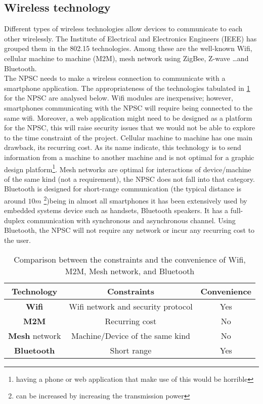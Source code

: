 \subsection{Wireless technology}\label{wireless_technologies}
Different types of wireless technologies allow devices to communicate to each other wirelessly. The Institute of Electrical and Electronics Engineers (IEEE) has grouped them in the 802.15 technologies. Among these are the well-known Wifi, cellular machine to machine (M2M), mesh network using ZigBee, Z-wave \ldots and Bluetooth. \\
The NPSC needs to make a wireless connection to communicate with a smartphone application. The appropriateness of the technologies tabulated in \cref{table:wireless} for the NPSC are analysed below. 
Wifi modules are inexpensive; however, smartphones communicating with the NPSC will require being connected to the same wifi. Moreover, a web application might need to be designed as a platform for the NPSC, this will raise security issues that we would not be able to explore to the time constraint of the project. Cellular machine to machine has one main drawback, its recurring cost. As its name indicate, this technology is to send information from a machine to another machine and is not optimal for a graphic design platform\footnote{having a phone or web application that make use of this would be horrible}.  Mesh networks are optimal for interactions of device/machine of the same kind (not a requirement), the NPSC does not fall into that category. Bluetooth is designed for short-range communication (the typical distance is around $10m$  \footnote{can be increased by increasing the transmission power})being in almost all smartphones it has been extensively used by embedded systems device such as handsets, Bluetooth speakers. It has a full-duplex communication with synchronous and asynchronous channel. Using Bluetooth, the NPSC will not require any network or incur any recurring cost to the user. 

\begin{table}[h!]
\centering
\caption{Comparison between the constraints and the convenience of Wifi, M2M, Mesh network, and Bluetooth}
\label{table:wireless}
\begin{tabular}{ccc}
\hline
\hline
\textbf{Technology} & \textbf{Constraints} & \textbf{Convenience} \\
\hline
\hline
\textbf{Wifi} & Wifi network and security protocol & Yes\\ 
\textbf{M2M} & Recurring cost & No\\
\textbf{Mesh} network & Machine/Device of the same kind & No\\
\textbf{Bluetooth} & Short range & Yes\\
\hline
\hline
\end{tabular}
\end{table}

